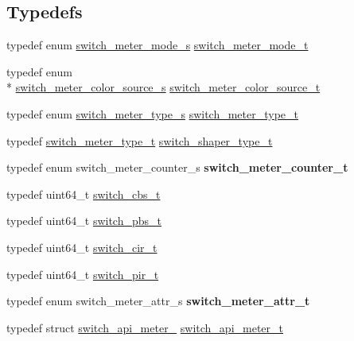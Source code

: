 \subsection*{Typedefs}
\begin{DoxyCompactItemize}
\item 
typedef enum \hyperlink{group__Meters_ga77f75da70758cac1c9fb171fa93f8cc2}{switch\+\_\+meter\+\_\+mode\+\_\+s} \hyperlink{group__Meters_ga3fa4bfd778bf4f4b0f4bebef85f70284}{switch\+\_\+meter\+\_\+mode\+\_\+t}
\item 
typedef enum \\*
\hyperlink{group__Meters_ga2eeabdade8a78d5e09693abf1f202539}{switch\+\_\+meter\+\_\+color\+\_\+source\+\_\+s} \hyperlink{group__Meters_ga5406e13de6b3be14a1ec8dd74ede4c55}{switch\+\_\+meter\+\_\+color\+\_\+source\+\_\+t}
\item 
typedef enum \hyperlink{group__Meters_ga280b2958172e3ad05fee3ffdb47b8113}{switch\+\_\+meter\+\_\+type\+\_\+s} \hyperlink{group__Meters_ga034a9655e1bdea0a64731ad6e6b375d6}{switch\+\_\+meter\+\_\+type\+\_\+t}
\item 
typedef \hyperlink{group__Meters_ga034a9655e1bdea0a64731ad6e6b375d6}{switch\+\_\+meter\+\_\+type\+\_\+t} \hyperlink{group__Meters_gaf0593a04026dacc8d7cf40c93b990bb5}{switch\+\_\+shaper\+\_\+type\+\_\+t}
\item 
\hypertarget{group__Meters_ga8b65420e0b3be4cd2ce4b46fab08fa6c}{typedef enum switch\+\_\+meter\+\_\+counter\+\_\+s {\bfseries switch\+\_\+meter\+\_\+counter\+\_\+t}}\label{group__Meters_ga8b65420e0b3be4cd2ce4b46fab08fa6c}

\item 
typedef uint64\+\_\+t \hyperlink{group__Meters_ga244ef2ce05d89f779a221e79f1550c84}{switch\+\_\+cbs\+\_\+t}
\item 
typedef uint64\+\_\+t \hyperlink{group__Meters_gafe2932127c3ce04089562a657642f3d5}{switch\+\_\+pbs\+\_\+t}
\item 
typedef uint64\+\_\+t \hyperlink{group__Meters_gaec2972cd53996da2a473dd74a55f4357}{switch\+\_\+cir\+\_\+t}
\item 
typedef uint64\+\_\+t \hyperlink{group__Meters_gae137996a5fcd00a72cb59367ebb7d711}{switch\+\_\+pir\+\_\+t}
\item 
\hypertarget{group__Meters_gada677ac701cdb1ae177d74d0409c1c99}{typedef enum switch\+\_\+meter\+\_\+attr\+\_\+s {\bfseries switch\+\_\+meter\+\_\+attr\+\_\+t}}\label{group__Meters_gada677ac701cdb1ae177d74d0409c1c99}

\item 
typedef struct \hyperlink{structswitch__api__meter__}{switch\+\_\+api\+\_\+meter\+\_\+} \hyperlink{group__Meters_ga39b6cf8a3c569d2feee8e369fbc90bb4}{switch\+\_\+api\+\_\+meter\+\_\+t}
\end{DoxyCompactItemize}
